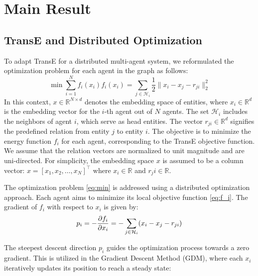 \documentclass[letterpaper, 10 pt, conference]{ieeeconf}  %
\begin{document}
\section{Main Result}

\subsection{TransE and Distributed Optimization}
To adapt TransE for a distributed multi-agent system, we reformulated the optimization problem for each agent in the graph as follows:
\begin{subequations}
\begin{equation}\label{eq:min}
    \min \sum_{i=1}^{N} f_{i} (x_{i})
\end{equation}
\begin{equation}\label{eq:f_i}
    f_{i}(x_{i}) = \sum_{j \in \mathcal{H}_{i}} \frac{1}{2} \|x_{i} - x_{j} - r_{ji}\|_{2}^{2}
\end{equation}
\end{subequations}
In this context, \( x \in \mathbb{R}^{N \times d} \) denotes the embedding space of entities, where \( x_i \in \mathbb{R}^d \) is the embedding vector for the \(i\)-th agent out of \( N \) agents. The set \( \mathcal{H}_i \) includes the neighbors of agent \( i \), which serve as head entities. The vector \( r_{ji} \in \mathbb{R}^d \) signifies the predefined relation from entity \( j \) to entity \( i \). The objective is to minimize the energy function \( f_i \) for each agent, corresponding to the TransE objective function. We assume that the relation vectors are normalized to unit magnitude and are uni-directed. For simplicity, the embedding space \(x\) is assumed to be a column vector: \(x = [x_1, x_2, \ldots, x_N]^\top\) where \(x_i \in \mathbb{R}\) and \(r_ji \in \mathbb{R}\).

The optimization problem \eqref{eq:min} is addressed using a distributed optimization approach. Each agent aims to minimize its local objective function \eqref{eq:f_i}. The gradient of \( f_i \) with respect to \( x_i \) is given by:
\begin{equation}
    p_i = - \pdv{f_{i}}{x_{i}} = - \sum_{j \in \mathcal{H}_i} (x_{i} - x_{j} - r_{ji})
    \label{eq:p}
\end{equation}

The steepest descent direction \( p_i \) guides the optimization process towards a zero gradient. This is utilized in the Gradient Descent Method (GDM), where each \( x_i \) iteratively updates its position to reach a steady state:
\end{document}
